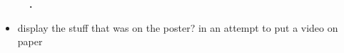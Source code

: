         \begin{figure}[ht]
            \centering
            \caption[not used]
            {
                \textbf{.}
            }
            \label{fig:video}
        \end{figure}

        \begin{itemize}
            \item display the stuff that was on the poster? in an attempt to put a video on paper
        \end{itemize}
